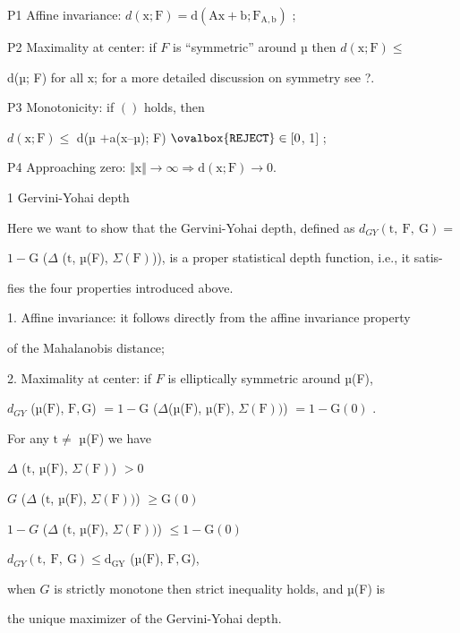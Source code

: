 \documentclass[a4paper,12pt]{article}
\begin{document}
P1 Affine invariance: $d(\mathrm{x};\mathrm{F})=\mathrm{d}(\mathrm{A}\mathrm{x}+\mathrm{b};\mathrm{F}_{\mathrm{A},\mathrm{b}})$ ;

P2 Maximality at center: if $F$ is “symmetric” around µ then $d(\mathrm{x};\mathrm{F}) \leq$

d(µ; F) for all $\mathrm{x}$; for a more detailed discussion on symmetry see ?.

P3 Monotonicity: if $()$ holds, then

$ d(\mathrm{x};\mathrm{F})\leq$ d(µ $+$a(x--µ); F) $\ovalbox{\tt\small REJECT}\in[0$, 1$]$ ;

P4 Approaching zero: $\Vert \mathrm{x}\Vert\rightarrow\infty\Rightarrow \mathrm{d}(\mathrm{x};\mathrm{F})\rightarrow 0.$

1 Gervini-Yohai depth

Here we want to show that the Gervini-Yohai depth, defined as $d_{GY}(\mathrm{t},\ \mathrm{F},\ \mathrm{G})=$

$1-\mathrm{G}$ ($\Delta$ ($\mathrm{t}$, µ(F), $\Sigma(\mathrm{F})$)), is a proper statistical depth function, i.e., it satis-

fies the four properties introduced above.

1. Affine invariance: it follows directly from the affine invariance property

of the Mahalanobis distance;

2. Maximality at center: if $F$ is elliptically symmetric around µ(F),
\begin{center}
$d_{GY}$ (µ($\mathrm{F}$), $\mathrm{F}, \mathrm{G}$) $=1-\mathrm{G}$ ($\Delta$(µ($\mathrm{F}$), µ($\mathrm{F}$), $\Sigma(\mathrm{F}))$) $=1-\mathrm{G}(0)$ .
\end{center}
For any $\mathrm{t}\neq$ µ(F) we have
\begin{center}
$\Delta$ ($\mathrm{t}$, µ($\mathrm{F}$), $\Sigma(\mathrm{F})$) $>0$

$G$ ($\Delta$ ($\mathrm{t}$, µ($\mathrm{F}$), $\Sigma(\mathrm{F}))$) $\geq \mathrm{G}(0)$

$1-G$ ($\Delta$ ($\mathrm{t}$, µ($\mathrm{F}$), $\Sigma(\mathrm{F}))$) $\leq 1-\mathrm{G}(0)$

$d_{GY}(\mathrm{t},\ \mathrm{F},\ \mathrm{G})\leq \mathrm{d}_{\mathrm{G}\mathrm{Y}}$ (µ($\mathrm{F}$), $\mathrm{F}, \mathrm{G}$),
\end{center}
when $G$ is strictly monotone then strict inequality holds, and µ(F) is

the unique maximizer of the Gervini-Yohai depth.
\end{document}

